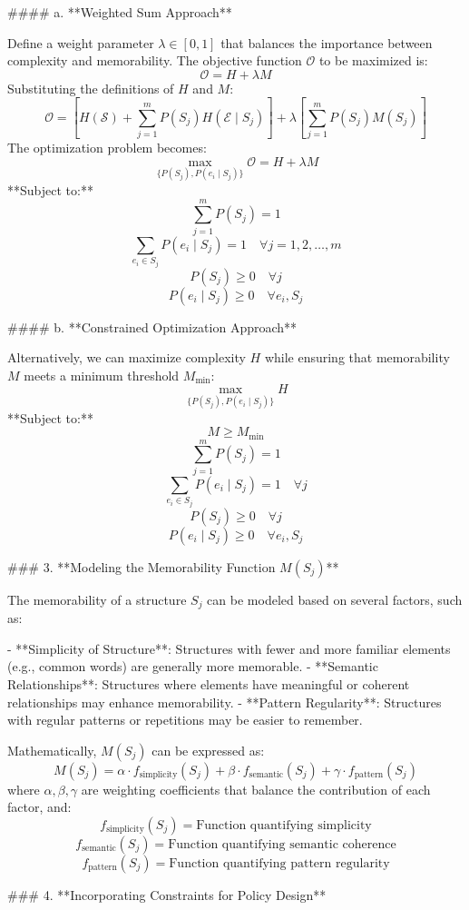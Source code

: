 #### a. **Weighted Sum Approach**

Define a weight parameter \( \lambda \in [0, 1] \) that balances the importance between complexity and memorability. The objective function \( \mathcal{O} \) to be maximized is:
\[
\mathcal{O} = H + \lambda M
\]
Substituting the definitions of \( H \) and \( M \):
\[
\mathcal{O} = \left[ H(\mathcal{S}) + \sum_{j=1}^{m} P(S_j) H(\mathcal{E} \mid S_j) \right] + \lambda \left[ \sum_{j=1}^{m} P(S_j) M(S_j) \right]
\]
The optimization problem becomes:
\[
\max_{\{ P(S_j), P(e_i \mid S_j) \}} \mathcal{O} = H + \lambda M
\]
**Subject to:**
\[
\sum_{j=1}^{m} P(S_j) = 1
\]
\[
\sum_{e_i \in S_j} P(e_i \mid S_j) = 1 \quad \forall j = 1, 2, \dots, m
\]
\[
P(S_j) \geq 0 \quad \forall j
\]
\[
P(e_i \mid S_j) \geq 0 \quad \forall e_i, S_j
\]

#### b. **Constrained Optimization Approach**

Alternatively, we can maximize complexity \( H \) while ensuring that memorability \( M \) meets a minimum threshold \( M_{\text{min}} \):
\[
\max_{\{ P(S_j), P(e_i \mid S_j) \}} H
\]
**Subject to:**
\[
M \geq M_{\text{min}}
\]
\[
\sum_{j=1}^{m} P(S_j) = 1
\]
\[
\sum_{e_i \in S_j} P(e_i \mid S_j) = 1 \quad \forall j
\]
\[
P(S_j) \geq 0 \quad \forall j
\]
\[
P(e_i \mid S_j) \geq 0 \quad \forall e_i, S_j
\]

### 3. **Modeling the Memorability Function \( M(S_j) \)**

The memorability of a structure \( S_j \) can be modeled based on several factors, such as:

- **Simplicity of Structure**: Structures with fewer and more familiar elements (e.g., common words) are generally more memorable.
- **Semantic Relationships**: Structures where elements have meaningful or coherent relationships may enhance memorability.
- **Pattern Regularity**: Structures with regular patterns or repetitions may be easier to remember.

Mathematically, \( M(S_j) \) can be expressed as:
\[
M(S_j) = \alpha \cdot f_{\text{simplicity}}(S_j) + \beta \cdot f_{\text{semantic}}(S_j) + \gamma \cdot f_{\text{pattern}}(S_j)
\]
where \( \alpha, \beta, \gamma \) are weighting coefficients that balance the contribution of each factor, and:
\[
f_{\text{simplicity}}(S_j) = \text{Function quantifying simplicity}
\]
\[
f_{\text{semantic}}(S_j) = \text{Function quantifying semantic coherence}
\]
\[
f_{\text{pattern}}(S_j) = \text{Function quantifying pattern regularity}
\]

### 4. **Incorporating Constraints for Policy Design**

